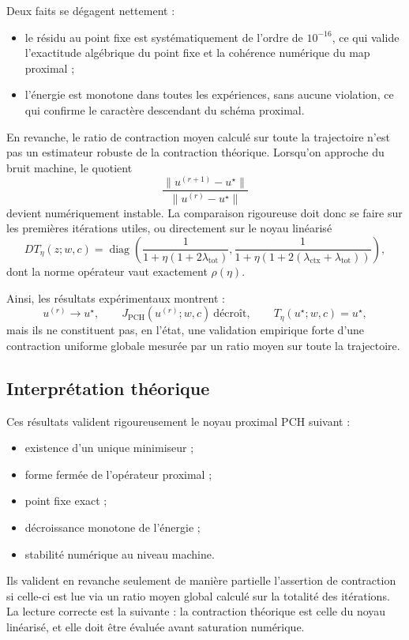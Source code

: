 \documentclass[11pt,a4paper]{article}
\newcommand{\1}{\mathbf 1}
\begin{document}
Deux faits se dégagent nettement :

\begin{itemize}
    \item le résidu au point fixe est systématiquement de l'ordre de \(10^{-16}\), ce qui valide l'exactitude algébrique du point fixe et la cohérence numérique du map proximal ;
    \item l'énergie est monotone dans toutes les expériences, sans aucune violation, ce qui confirme le caractère descendant du schéma proximal.
\end{itemize}

En revanche, le ratio de contraction moyen calculé sur toute la trajectoire n'est pas un estimateur robuste de la contraction théorique. Lorsqu'on approche du bruit machine, le quotient
\[
\frac{\|u^{(r+1)}-u^\star\|}{\|u^{(r)}-u^\star\|}
\]
devient numériquement instable. La comparaison rigoureuse doit donc se faire sur les premières itérations utiles, ou directement sur le noyau linéarisé
\[
D T_\eta(z;w,c)
=
\operatorname{diag}\!\left(
\frac{1}{1+\eta(1+2\lambda_{\mathrm{tot}})},
\frac{1}{1+\eta(1+2(\lambda_{\mathrm{ctx}}+\lambda_{\mathrm{tot}}))}
\right),
\]
dont la norme opérateur vaut exactement \(\rho(\eta)\).

Ainsi, les résultats expérimentaux montrent :
\[
u^{(r)} \to u^\star,
\qquad
J_{\mathrm{PCH}}(u^{(r)};w,c)\ \text{décroît},
\qquad
T_\eta(u^\star;w,c)=u^\star,
\]
mais ils ne constituent pas, en l'état, une validation empirique forte d'une contraction uniforme globale mesurée par un ratio moyen sur toute la trajectoire.

\subsection{Interprétation théorique}

Ces résultats valident rigoureusement le noyau proximal PCH suivant :

\begin{itemize}
    \item existence d'un unique minimiseur ;
    \item forme fermée de l'opérateur proximal ;
    \item point fixe exact ;
    \item décroissance monotone de l'énergie ;
    \item stabilité numérique au niveau machine.
\end{itemize}

Ils valident en revanche seulement de manière partielle l'assertion de contraction si celle-ci est lue via un ratio moyen global calculé sur la totalité des itérations.
La lecture correcte est la suivante : la contraction théorique est celle du noyau linéarisé, et elle doit être évaluée avant saturation numérique.
\end{document}
